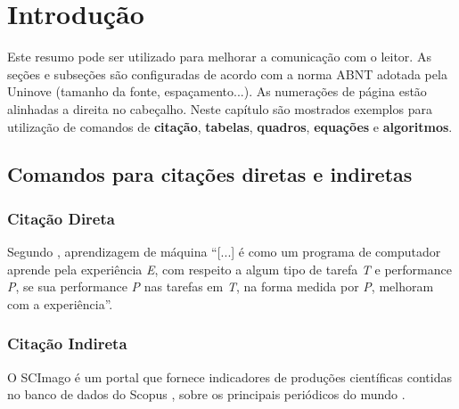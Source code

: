 \chapter{Introdução}
\label{ch:introducao}
	\begin{resumocapitulo}
		Este resumo pode ser utilizado para melhorar a comunicação com o leitor. As seções e subseções são configuradas de acordo com a norma ABNT adotada pela Uninove (tamanho da fonte, espaçamento...). As numerações de página estão alinhadas a direita no cabeçalho. Neste capítulo são mostrados exemplos para utilização de comandos de \textbf{citação}, \textbf{tabelas}, \textbf{quadros}, \textbf{equações} e \textbf{algoritmos}.
	\end{resumocapitulo}

	\section{Comandos para citações diretas e indiretas}
	\label{sec:citacoes}
		\subsection{Citação Direta}
		\label{subsec:citacao_direta}
			Segundo , aprendizagem de máquina ``[...] é como um programa de computador aprende pela experiência \textit{E}, com respeito a algum tipo de tarefa \textit{T} e performance \textit{P}, se sua performance \textit{P} nas tarefas em \textit{T}, na forma medida por \textit{P}, melhoram com a experiência''.

		\subsection{Citação Indireta}
		\label{subsec:citacao_indireta}
			O SCImago é um portal que fornece indicadores de produções científicas contidas no banco de dados do Scopus \cite{Villasenor-Almaraz2019}, sobre os principais periódicos do mundo \cite{DUggento2016}.
		
